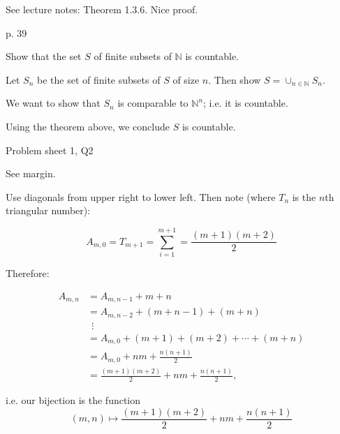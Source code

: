 See lecture notes: Theorem 1.3.6. Nice proof.

\begin{problem}{p. 39}{}


    Show that the set $S$ of finite subsets of $\mathbb{N}$ is countable.

    \tcblower

    Let $S_n$ be the set of finite subsets of $S$ of size $n$. Then show $S = \cup_{n \in \mathbb{N}} S_n$.

    We want to show that $S_n$ is comparable to $\mathbb{N}^n$; i.e. it is countable.
    
    Using the theorem above, we conclude $S$ is countable.
    
\end{problem}

\begin{problem}{Problem sheet 1, Q2}{}


    See margin.

    \tcblower

    Use diagonals from upper right to lower left. Then note (where $T_n$ is the $n$th triangular number):

    $$ A_{m, 0} = T_{m+1} = \sum_{i=1}^{m+1} = \frac{(m+1)(m+2)}{2} $$

    Therefore:

    \begin{align*}
        A_{m, n} &= A_{m, n-1} + m + n \\
        &= A_{m, n-2} + (m + n - 1) + (m + n) \\
        &\ \ \vdots \\
        &= A_{m, 0} + (m + 1) + (m + 2) + \cdots + (m + n) \\
        &= A_{m, 0} + nm + \frac{n (n+1)}{2} \\
        &= \frac{(m+1)(m+2)}{2} + nm + \frac{n (n+1)}{2} ,
    \end{align*}

    i.e. our bijection is the function
        $$ (m, n) \mapsto \frac{(m+1)(m+2)}{2} + nm + \frac{n (n+1)}{2} $$
    
\end{problem}

